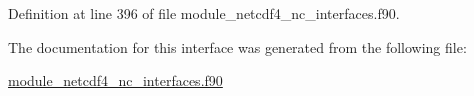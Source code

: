 Definition at line 396 of file module\+\_\+netcdf4\+\_\+nc\+\_\+interfaces.\+f90.



The documentation for this interface was generated from the following file\+:\begin{DoxyCompactItemize}
\item 
\hyperlink{module__netcdf4__nc__interfaces_8f90}{module\+\_\+netcdf4\+\_\+nc\+\_\+interfaces.\+f90}\end{DoxyCompactItemize}
